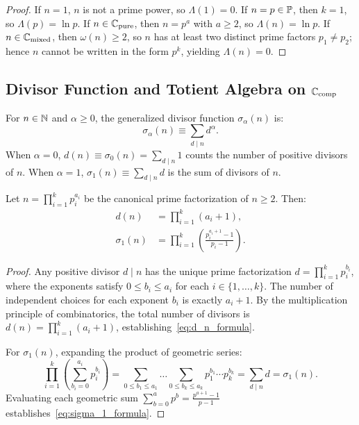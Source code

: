 \begin{proof}
\leanok
If $n = 1$, $n$ is not a prime power, so $\Lambda(1) = 0$. If $n = p \in \mathbb{P}$, then $k = 1$, so $\Lambda(p) = \ln p$. If $n \in \mathbb{C}_{\mathrm{pure}}$, then $n = p^a$ with $a \ge 2$, so $\Lambda(n) = \ln p$. If $n \in \mathbb{C}_{\mathrm{mixed}}$, then $\omega(n) \ge 2$, so $n$ has at least two distinct prime factors $p_1 \neq p_2$; hence $n$ cannot be written in the form $p^k$, yielding $\Lambda(n) = 0$.
\end{proof}

\subsection{Divisor Function and Totient Algebra on \texorpdfstring{$\mathbb{C}_{\mathrm{comp}}$}{C_comp}}

\begin{definition}
\label{def:divisor_functions}
\leanok
For $n \in \mathbb{N}$ and $\alpha \ge 0$, the generalized divisor function $\sigma_\alpha(n)$ is:
\begin{equation}
\sigma_\alpha(n) \equiv \sum_{d \mid n} d^\alpha.
\end{equation}
When $\alpha = 0$, $d(n) \equiv \sigma_0(n) = \sum_{d \mid n} 1$ counts the number of positive divisors of $n$. When $\alpha = 1$, $\sigma_1(n) \equiv \sum_{d \mid n} d$ is the sum of divisors of $n$.
\end{definition}

\begin{theorem}
\label{thm:divisor_multiplicative}
\leanok
Let $n = \prod_{i=1}^k p_i^{a_i}$ be the canonical prime factorization of $n \ge 2$. Then:
\begin{align}
\label{eq:d_n_formula}
d(n) &= \prod_{i=1}^k (a_i + 1), \\
\label{eq:sigma_1_formula}
\sigma_1(n) &= \prod_{i=1}^k \left( \frac{p_i^{a_i+1} - 1}{p_i - 1} \right).
\end{align}
\end{theorem}

\begin{proof}
\leanok
Any positive divisor $d \mid n$ has the unique prime factorization $d = \prod_{i=1}^k p_i^{b_i}$, where the exponents satisfy $0 \le b_i \le a_i$ for each $i \in \{1, \dots, k\}$.
The number of independent choices for each exponent $b_i$ is exactly $a_i + 1$. By the multiplication principle of combinatorics, the total number of divisors is $d(n) = \prod_{i=1}^k (a_i + 1)$, establishing~\eqref{eq:d_n_formula}.

For $\sigma_1(n)$, expanding the product of geometric series:
$$\prod_{i=1}^k \left( \sum_{b_i=0}^{a_i} p_i^{b_i} \right) = \sum_{0 \le b_1 \le a_1} \dots \sum_{0 \le b_k \le a_k} p_1^{b_1} \cdots p_k^{b_k} = \sum_{d \mid n} d = \sigma_1(n).$$
Evaluating each geometric sum $\sum_{b=0}^a p^b = \frac{p^{a+1} - 1}{p - 1}$ establishes~\eqref{eq:sigma_1_formula}.
\end{proof}

